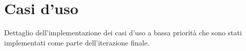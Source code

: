 \section{Casi d'uso}
Dettaglio dell'implementazione dei casi d'uso a bassa priorità che sono stati implementati come parte dell'iterazione finale.
